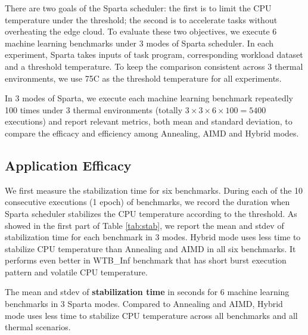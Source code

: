 There are two goals of the Sparta scheduler: the first is to limit the CPU temperature under the threshold; the second is to accelerate tasks without overheating the edge cloud. To evaluate these two objectives, we execute 6 machine learning benchmarks under 3 modes of Sparta scheduler. In each experiment, Sparta takes inputs of task program, corresponding workload dataset and a threshold temperature. To keep the comparison consistent across 3 thermal environments, we use 75\degree C as the threshold temperature for all experiments.

In 3 modes of Sparta, we execute each machine learning benchmark repeatedly 100 times under 3 thermal environments (totally $3 \times 3 \times 6 \times 100 = 5400$ executions) and report relevant metrics, both mean and standard deviation, to compare the efficacy and efficiency among Annealing, AIMD and Hybrid modes.


\subsection{Application Efficacy}

We first measure the stabilization time for six benchmarks. During each of the 10 consecutive executions (1 epoch) of benchmarks, we record the duration when Sparta scheduler stabilizes the CPU temperature according to the threshold. As showed in the first part of Table \ref{tab:stab}, we report the mean and stdev of stabilization time for each benchmark in 3 modes. Hybrid mode uses less time to stabilize CPU temperature than Annealing and AIMD in all six benchmarks. It performs even better in WTB\_Inf benchmark that has short burst execution pattern and volatile CPU temperature.


\begin{table}[t]
\caption{The mean and stdev of \textbf{stabilization time} in seconds for 6 machine learning benchmarks in 3 Sparta modes. Compared to Annealing and AIMD, Hybrid mode uses less time to stabilize CPU temperature across all benchmarks and all thermal scenarios. }\label{tab:stab}
\vspace{1mm}
\centering
\resizebox{350pt}{!}{}
\newline
\vspace{3mm}
\newline
\resizebox{300pt}{!}{}
\end{table}




